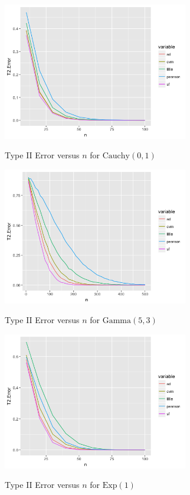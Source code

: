 \documentclass[twoside]{article}
\begin{document}
\begin{center}
\makeatletter
\def\@captype{figure}
\makeatother
\includegraphics [height=6cm]{code/cauchy.png}
\caption{Type II Error versus $n$ for $\mathrm{Cauchy}(0,1)$}
\label{T2Ecauchy}
\end{center}

\begin{center}
\makeatletter
\def\@captype{figure}
\makeatother
\includegraphics [height=6cm]{code/gamma.png}
\caption{Type II Error versus $n$ for $\mathrm{Gamma}(5,3)$}
\label{T2Egamma}
\end{center}

\begin{center}
\makeatletter
\def\@captype{figure}
\makeatother
\includegraphics [height=6cm]{code/exp.png}
\caption{Type II Error versus $n$ for $\mathrm{Exp}(1)$}
\label{T2Eexp}
\end{center}
\end{document}
